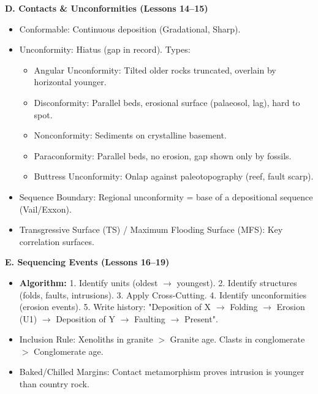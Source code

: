 \documentclass[11pt]{article}
\newcommand{\cle}[1]{{\popxbold\color{popdark}#1}}
\begin{document}
\begin{aretenir}
\textbf{D. Contacts \& Unconformities (Lessons 14--15)}
\begin{itemize}
    \item \cle{Conformable}: Continuous deposition (Gradational, Sharp).
    \item \cle{Unconformity}: Hiatus (gap in record). Types:
    \begin{itemize}
        \item \cle{Angular Unconformity}: Tilted older rocks truncated, overlain by horizontal younger.
        \item \cle{Disconformity}: Parallel beds, erosional surface (palaeosol, lag), hard to spot.
        \item \cle{Nonconformity}: Sediments on crystalline basement.
        \item \cle{Paraconformity}: Parallel beds, no erosion, gap shown only by fossils.
        \item \cle{Buttress Unconformity}: Onlap against paleotopography (reef, fault scarp).
    \end{itemize}
    \item \cle{Sequence Boundary}: Regional unconformity = base of a depositional sequence (Vail/Exxon).
    \item \cle{Transgressive Surface (TS)} / \cle{Maximum Flooding Surface (MFS)}: Key correlation surfaces.
\end{itemize}

\textbf{E. Sequencing Events (Lessons 16--19)}
\begin{itemize}
    \item \textbf{Algorithm:} 1. Identify units (oldest $\rightarrow$ youngest). 2. Identify structures (folds, faults, intrusions). 3. Apply Cross-Cutting. 4. Identify unconformities (erosion events). 5. Write history: "Deposition of X $\rightarrow$ Folding $\rightarrow$ Erosion (U1) $\rightarrow$ Deposition of Y $\rightarrow$ Faulting $\rightarrow$ Present".
    \item \cle{Inclusion Rule}: Xenoliths in granite $>$ Granite age. Clasts in conglomerate $>$ Conglomerate age.
    \item \cle{Baked/Chilled Margins}: Contact metamorphism proves intrusion is younger than country rock.
\end{itemize}


\end{aretenir}
\end{document}
